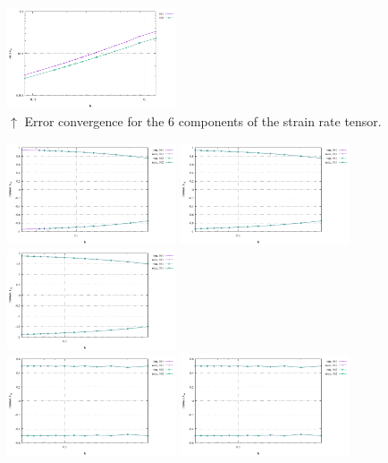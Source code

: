 \begin{center}
\includegraphics[width=5cm]{python_codes/fieldstone_75/results/mms3D/errors_eyz}\\
{\captionfont $\uparrow$ Error convergence for the 6 components of the strain rate tensor.}
\end{center}

\begin{center}
\includegraphics[width=5cm]{python_codes/fieldstone_75/results/mms3D/exx_stats.pdf}
\includegraphics[width=5cm]{python_codes/fieldstone_75/results/mms3D/eyy_stats.pdf}
\includegraphics[width=5cm]{python_codes/fieldstone_75/results/mms3D/ezz_stats.pdf}\\
\includegraphics[width=5cm]{python_codes/fieldstone_75/results/mms3D/exy_stats.pdf}
\includegraphics[width=5cm]{python_codes/fieldstone_75/results/mms3D/exz_stats.pdf}

\end{center}
